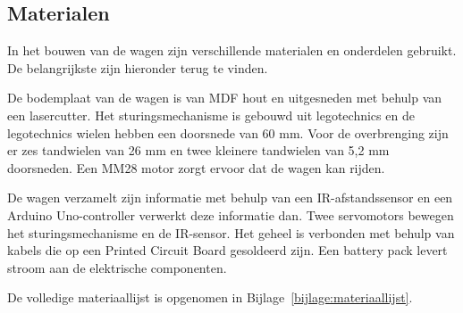 \subsection{Materialen}
In het bouwen van de wagen zijn verschillende materialen en onderdelen gebruikt. De belangrijkste zijn hieronder terug te vinden.

De bodemplaat van de wagen is van MDF hout en uitgesneden met behulp van een lasercutter. Het sturingsmechanisme is gebouwd uit legotechnics en de legotechnics wielen hebben een doorsnede van 60 mm. Voor de overbrenging zijn er zes tandwielen van 26 mm en twee kleinere tandwielen van 5,2 mm doorsneden.
Een MM28 motor zorgt ervoor dat de wagen kan rijden. 

De wagen verzamelt zijn informatie met behulp van een IR-afstandssensor en een Arduino Uno-controller verwerkt deze informatie dan. Twee servomotors bewegen het sturingsmechanisme en de IR-sensor. Het geheel is verbonden met behulp van kabels die op een Printed Circuit Board gesoldeerd zijn. Een battery pack levert stroom aan de elektrische componenten. 

De volledige materiaallijst is opgenomen in Bijlage~\ref{bijlage:materiaallijst}. 

